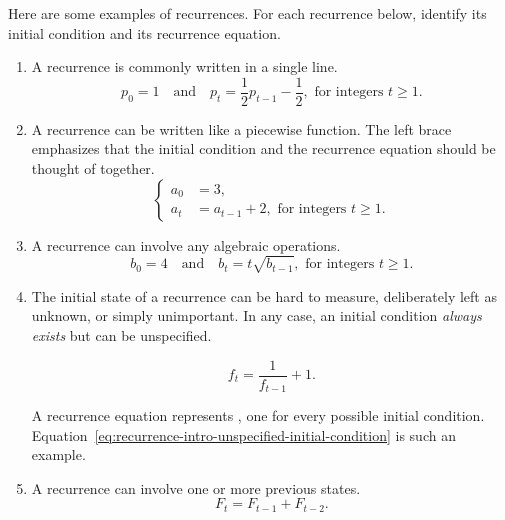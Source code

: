 \documentclass[../main.tex]{subfiles}
\begin{document}
\begin{exercise} \label{ex:recurrence-identify}
  Here are some examples of recurrences. For each recurrence below, identify its initial condition and its recurrence equation.

  \begin{enumerate}[wide, itemsep={2ex}]
    \item 
      A recurrence is commonly written in a single line.
      \begin{equation} \label{eq:recurrence-intro-oneline}
        p_{0} = 1 \quad\text{and}\quad p_{t} = \frac{1}{2} p_{t-1} - \frac{1}{2}, \text{ for integers } t \ge 1.
      \end{equation}

    \item 
      A recurrence can be written like a piecewise function. The left brace emphasizes that the initial condition and the recurrence equation should be thought of together. 
      \begin{equation} \label{eq:recurrence-intro-left-brace}
        \left\{
          \begin{aligned}
            a_{0} &= 3,  \\
            a_{t} &= a_{t-1} + 2,  \text{ for integers } t \ge 1.
          \end{aligned}
        \right.
      \end{equation}

    \item 
      A recurrence can involve any algebraic operations.
      \begin{equation} \label{eq:recurrence-intro-sqrt}
        b_{0} = 4 \quad\text{and}\quad b_{t} = t \sqrt{b_{t-1}}, \text{ for integers } t \ge 1.
      \end{equation}

    \item 
      The initial state of a recurrence can be hard to measure, deliberately left as unknown, or simply unimportant. In any case, an initial condition \emph{always exists} but can be unspecified.  

      \begin{equation} \label{eq:recurrence-intro-unspecified-initial-condition}
        f_{t} = \frac{1}{f_{t-1}} + 1.
      \end{equation}

      A recurrence equation  represents \underline{\hfill{} \phantom{Xy infinitely many recurrences Xy Xy}}, one for every possible initial condition. Equation~\eqref{eq:recurrence-intro-unspecified-initial-condition} is such an example.

    \item 
      A recurrence can involve one or more previous states.
      \begin{equation} \label{eq:recurrence-intro-fib}
        F_{t} = F_{t-1} + F_{t-2}.
      \end{equation}
  \end{enumerate}
\end{exercise}
\end{document}
